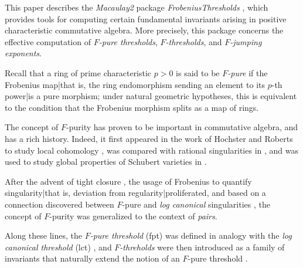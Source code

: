 \documentclass{amsart}
\begin{document}


This paper describes the \emph{Macaulay2} \cite{M2} package \emph{FrobeniusThresholds} \cite{FThresholdsPackage}, which provides tools for computing certain fundamental invariants arising in positive characteristic commutative algebra.  More precisely, this package concerns the effective computation of \emph{$F$-pure thresholds}, \emph{$F$-thresholds}, and \emph{$F$-jumping exponents}.

Recall that a ring of prime characteristic $p>0$ is said to be \emph{$F$-pure} if the Frobenius map|that is, the ring endomorphism sending an element to its $p$-th power|is a pure morphism;  under natural geometric hypotheses, this is equivalent to the condition that the Frobenius morphism splits as a map of rings.

The concept of $F$-purity has proven to be important in commutative algebra, and has a rich history.  Indeed, it first appeared in the work \cite{HochsterRobertsFrobeniusLocalCohomology}  of Hochster and Roberts to study local cohomology \cite{HochsterRobertsFrobeniusLocalCohomology}, was compared with rational singularities in  \cite{FedderFPureRat}, and was used to study global properties of Schubert varieties in \cite{MehtaRamanathanFrobeniusSplittingAndCohomologyVanishing}.

After the advent of tight closure \cite{HochsterHunekeTC1}, the usage of Frobenius to quantify singularity|that is, deviation from regularity|proliferated, and based on a connection discovered between $F$-pure and \emph{log canonical} singularities \cite{HaraWatanabeFRegFPure}, the concept of $F$-purity was generalized to the context of \emph{pairs}.

Along these lines, the \emph{$F$-pure threshold} (fpt)%
was defined in analogy with the \emph{log canonical threshold} (lct) \cite{TakagiWatanabeFPureThresh}, and
\emph{$F$-threholds} were then introduced as a family of invariants that naturally extend the notion of an $F$-pure threshold \cite{MustataTakagiWatanabeFThresholdsAndBernsteinSato}.
\end{document}
